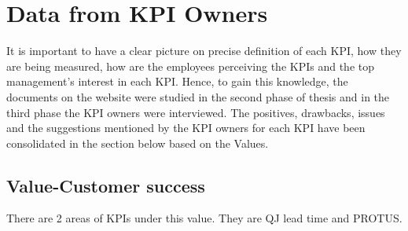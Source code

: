\section{Data from KPI Owners}

It is important to have a clear picture on precise definition of each KPI, how they are being measured, how are the employees perceiving the KPIs and the top management's interest in each KPI. Hence, to gain this knowledge, the documents on the website were studied in the second phase of thesis and in the third phase the KPI owners were interviewed. The positives, drawbacks, issues and the suggestions mentioned by the KPI owners for each KPI have been consolidated in the section below based on the Values.

\subsection{Value-Customer success} There are 2 areas of KPIs under this value. They are QJ lead time and PROTUS.

